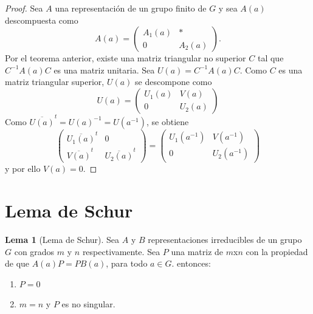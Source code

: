 \documentclass[12pt]{book}
\theoremstyle{definition}
\newtheorem{lemma}[theorem]{Lema}
\newcounter{in}
\newcounter{ini}
\begin{document}
\begin{proof}
  Sea $A$ una representación de un grupo finito de $G$ y sea $A(a)$
  descompuesta como
  \begin{equation}
    \label{eq:13}
        A(a)=
    \begin{pmatrix}
      A_{1}(a) & * \\ 
      0 & A_{2}(a)
    \end{pmatrix}.
  \end{equation}
  Por el teorema anterior, existe una matriz triangular no superior
  $C$ tal que $C^{-1}A(a)C$ es una matriz unitaria. Sea
  $U(a)=C^{-1}A(a)C$. Como $C$ es una matriz triangular superior,
  $U(a)$ se descompone como
  \begin{equation}
    \label{eq:14}
    U(a)=
    \begin{pmatrix}
      U_{1}(a) & V(a) \\ 
      0 & U_{2}(a)
    \end{pmatrix}
  \end{equation}  
  Como $\overline{U(a)}^{t}=U(a)^{-1}=U(a^{-1})$, se obtiene
  \begin{equation}
    \label{eq:15}
    \begin{pmatrix}
      \overline{U_{1}(a)}^{t} & 0 \\ 
      \overline{V(a)}^{t} & \overline{U_{2}(a)}^{t}
    \end{pmatrix}
    =
    \begin{pmatrix}
      U_{1}(a^{-1}) & V(a^{-1}) \\ 
      0 & U_{2}(a^{-1})
    \end{pmatrix}
  \end{equation}
  y por ello $V(a)=0$.
\end{proof}

\section{Lema de Schur}
\label{sec:schur}

\begin{lemma}[Lema de Schur]
  \label{l3_1}
  Sea $A$ y $B$ representaciones
  irreducibles de un grupo $G$ con grados $m$ y $n$ respectivamente. Sea
  $P$ una matriz de $m$x$n$ con la propiedad de que $A(a)P=PB(a)$, para
  todo $a \in G$.  entonces:
  \begin{enumerate}
  \item $P=0$
  \item $m=n$ y $P$ es no singular.
  \end{enumerate}
\end{lemma}
\end{document}
